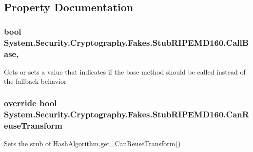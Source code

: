 \subsection{Property Documentation}
\hypertarget{class_system_1_1_security_1_1_cryptography_1_1_fakes_1_1_stub_r_i_p_e_m_d160_aad63322d0b0b4b4e410ccb6e5f942d94}{
\subsubsection[{Call\-Base}]{\setlength{\rightskip}{0pt plus 5cm}bool System.\-Security.\-Cryptography.\-Fakes.\-Stub\-R\-I\-P\-E\-M\-D160.\-Call\-Base\hspace{0.3cm}{\ttfamily [get]}, {\ttfamily [set]}}}\label{class_system_1_1_security_1_1_cryptography_1_1_fakes_1_1_stub_r_i_p_e_m_d160_aad63322d0b0b4b4e410ccb6e5f942d94}


Gets or sets a value that indicates if the base method should be called instead of the fallback behavior

\hypertarget{class_system_1_1_security_1_1_cryptography_1_1_fakes_1_1_stub_r_i_p_e_m_d160_ab9354ff651329002186ac59177a0d607}{
\subsubsection[{Can\-Reuse\-Transform}]{\setlength{\rightskip}{0pt plus 5cm}override bool System.\-Security.\-Cryptography.\-Fakes.\-Stub\-R\-I\-P\-E\-M\-D160.\-Can\-Reuse\-Transform\hspace{0.3cm}{\ttfamily [get]}}}\label{class_system_1_1_security_1_1_cryptography_1_1_fakes_1_1_stub_r_i_p_e_m_d160_ab9354ff651329002186ac59177a0d607}


Sets the stub of Hash\-Algorithm.\-get\-\_\-\-Can\-Reuse\-Transform()

